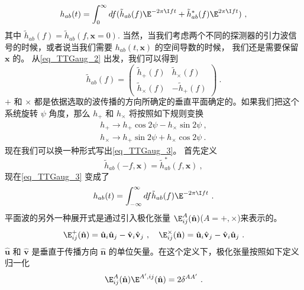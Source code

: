 \begin{equation}\label{eq_TTGaug_3}
h_{ab} (t) = \int^\infty_0 df ( \tilde h_{ab} (f) \E^{-2\pi \I f t} + \tilde h^*_{ab} (f) \E^{2\pi \I f t} ) ~, 
\end{equation}
其中 $\tilde h_{ab}(f) = \tilde h_{ab}(f,\mathbf x = 0)$. 当然，当我们考虑两个不同的探测器的引力波信号的时候，或者说当我们需要 $h_{ab}(t,\mathbf x)$ 的空间导数的时候， 我们还是需要保留 $\mathbf x$ 的。 从\autoref{eq_TTGaug_2} 出发，我们可以得到
\begin{equation}
\tilde h_{ab} (f) = 
\begin{pmatrix}
\tilde h_+(f) & \tilde h_{\times} (f) \\
\tilde h_{\times} (f) & -\tilde h_+ (f) 
\end{pmatrix}~.
\end{equation}
$+$ 和 $\times$ 都是依据选取的波传播的方向所确定的垂直平面确定的。如果我们把这个系统旋转 $\psi$ 角度，那么 $h_+$ 和 $h_{\times}$ 将按照如下规则变换
\begin{equation}
\begin{aligned}
h_+\rightarrow h_+ \cos 2 \psi - h_\times \sin 2 \psi ~, \\
h_\times \rightarrow h_+ \sin 2 \psi + h_\times \cos 2\psi ~.
\end{aligned}
\end{equation}
现在我们可以换一种形式写出\autoref{eq_TTGaug_3}。 首先定义
\begin{equation}
\tilde h_{ab} (-f,\mathbf x) = \tilde h^*_{ab} (f,\mathbf x) ~,
\end{equation}
现在\autoref{eq_TTGaug_3} 变成了
\begin{equation}
h_{ab} (t) = \int_{-\infty}^{\infty} df \tilde h_{ab} (f) \E^{-2\pi \I f t}~. 
\end{equation}
平面波的另外一种展开式是通过引入极化张量 $\E^A_{ij}(\hat{ {\mathbf n} })$($A = +,\times$)来表示的。 
\begin{equation}
\E^+_{ij} (\hat{ {\mathbf n} }) = \hat{{\mathbf u} }_i \hat{{\mathbf u} }_j - \hat{{\mathbf v} }_i \hat{{\mathbf v} }_j~, \quad \E^\times_{ij} (\hat{ {\mathbf n} }) = \hat{{\mathbf u} }_i \hat{{\mathbf v} }_j - \hat{{\mathbf v} }_i \hat{{\mathbf u} }_j ~.
\end{equation}
$\hat{ {\mathbf u} }$ 和 $\hat{ {\mathbf v} }$ 是垂直于传播方向 $\hat{  {\mathbf n}  }$ 的单位矢量。在这个定义下，极化张量按照如下定义归一化
\begin{equation}
\E^A_{ij}(\hat{ {\mathbf n} }) \E^{A',ij} (\hat{ {\mathbf n} }) = 2 \delta^{AA'} ~.  
\end{equation}
